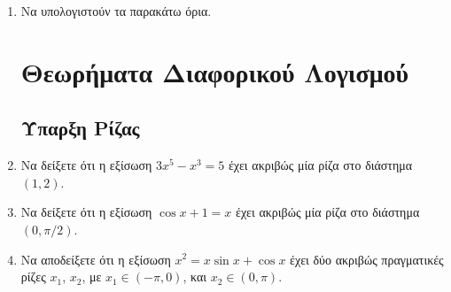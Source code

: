 \begin{enumerate}
    \item Να υπολογιστούν τα παρακάτω όρια.
      \begin{enumerate}[i)]
      \end{enumerate}


      \section*{Θεωρήματα Διαφορικού Λογισμού}

      \subsection*{Ύπαρξη Ρίζας}

    \item Να δείξετε ότι η εξίσωση $ 3x^{5}-x^{3}=5 $ έχει ακριβώς μία ρίζα στο διάστημα 
      $ (1,2) $.
    \item Να δείξετε ότι η εξίσωση $ \cos{x} + 1 = x $ έχει ακριβώς μία ρίζα στο διάστημα 
      $ (0, \pi/2) $. 

    \item Να αποδείξετε ότι η εξίσωση $ x^{2} = x \sin{x} + \cos{x} $ 
      έχει δύο ακριβώς πραγματικές ρίζες $ x_{1} $, $ x_{2} $, με $ x_{1} \in (-\pi, 0) $, 
      και $x_{2} \in (0, \pi) $.


\end{enumerate}
